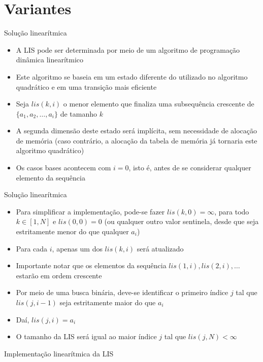 \section{Variantes}

\begin{frame}[fragile]{Solução linearítmica}

    \begin{itemize}
        \item A LIS pode ser determinada por meio de um algoritmo de programação dinâmica linearítmico

        \item Este algoritmo se baseia em um estado diferente do utilizado no algoritmo
            quadrático e em uma transição mais eficiente

        \item Seja $lis(k, i)$ o menor elemento que finaliza uma subsequência crescente de
            $\{ a_1, a_2, \ldots, a_i \}$ de tamanho $k$

        \item A segunda dimensão deste estado será implícita, sem necessidade de alocação de
            memória (caso contrário, a alocação da tabela de memória já tornaria este 
            algoritmo quadrático)

        \item Os casos bases acontecem com $i = 0$, isto é, antes de se considerar qualquer
            elemento da sequência

    \end{itemize}

\end{frame}

\begin{frame}[fragile]{Solução linearítmica}

    \begin{itemize}
        \item Para simplificar a implementação, pode-se fazer $lis(k, 0) = \infty$, para 
            todo $k\in [1, N]$ e $lis(0, 0) = 0$ (ou qualquer outro valor sentinela, desde
            que seja estritamente menor do que qualquer $a_i$)

        \item Para cada $i$, apenas um dos $lis(k, i)$ será atualizado

        \item Importante notar que os elementos da sequência $lis(1, i), lis(2, i), \ldots$
            estarão em ordem crescente

        \item Por meio de uma busca binária, deve-se identificar o primeiro índice $j$ tal que
            $lis(j, i - 1)$ seja estritamente maior do que $a_i$

        \item Daí, $lis(j, i) = a_i$

        \item O tamanho da LIS será igual ao maior índice $j$ tal que $lis(j, N) < \infty$
    \end{itemize}

\end{frame}



\begin{frame}[fragile]{Implementação linearítmica da LIS}
\end{frame}
